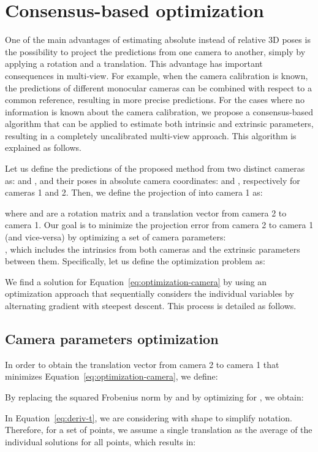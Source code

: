 \documentclass[10pt,twocolumn,letterpaper]{article}
\begin{document}
\section{Consensus-based optimization}
\label{sec:consensus-optimization}

One of the main advantages of estimating absolute instead of relative 3D poses
is the possibility to project the predictions from one camera to another,
simply by applying a rotation and a translation.  This advantage has important
consequences in multi-view. For example, when the camera calibration is known,
the predictions of different monocular cameras can be combined with respect to a common
reference, resulting in more precise predictions.
For the cases where no
information is known about the camera calibration, we propose a consensus-based
algorithm that can be applied to estimate both intrinsic and extrinsic
parameters, resulting in a completely uncalibrated multi-view approach. This
algorithm is explained as follows.


Let us define the predictions of the proposed method from two distinct cameras as:
 and
, and
their poses in absolute camera coordinates:
 and
, respectively for cameras 1 and 2.
Then, we define the projection of  into camera 1 as:

where  and
 are a rotation
matrix and a translation vector from camera 2 to camera 1.
Our goal is to minimize the projection error from camera 2 to camera 1 (and
vice-versa) by optimizing a set of camera parameters:\\
, which includes the
intrinsics from both cameras and the extrinsic parameters between them.
Specifically, let us define the optimization problem as:

We find a solution for Equation~\ref{eq:optimization-camera} by using an optimization approach that sequentially considers the individual variables by alternating gradient with
steepest descent. This process is detailed as follows.


\subsection{Camera parameters optimization}

In order to obtain the translation vector from camera 2 to camera 1 that
minimizes Equation~\ref{eq:optimization-camera}, we define:

By replacing the squared Frobenius norm  by
 and by optimizing for
, we obtain:

In Equation~\ref{eq:deriv-t}, we are considering  with shape
 to simplify notation. Therefore, for a set of
 points, we assume a single translation as the average of the individual
solutions for all points, which results in:
\end{document}

